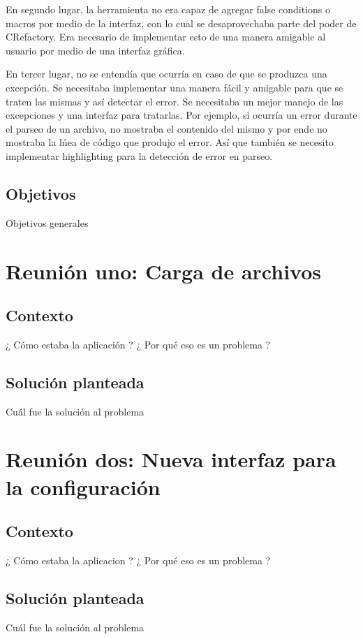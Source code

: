 \documentclass[a4paper,oneside,10pt]{article}
\begin{document}
En segundo lugar, la herramienta no era capaz de agregar false conditions o macros por medio de la interfaz, con lo cual se desaprovechaba  parte del poder de CRefactory. Era necesario de implementar esto de una manera amigable al usuario por medio de una interfaz gr\'afica.

En tercer lugar, no se entend\'ia que ocurr\'ia en caso de que se produzca una excepci\'on. Se necesitaba implementar una manera f\'acil y amigable para que se traten las mismas y as\'i detectar el error. Se necesitaba un mejor manejo de las excepciones y una interfaz para tratarlas.
Por ejemplo, si ocurr\'ia un error durante el parseo de un archivo, no mostraba el contenido del mismo y por ende no mostraba la l\'nea de c\'odigo que produjo el error. As\'i que tambi\'en se necesito implementar highlighting para la detecci\'on de error en parseo.


\subsection{Objetivos}
Objetivos generales

\section{Reuni\'on uno: Carga de archivos}

\subsection{Contexto}
¿ C\'omo estaba la aplicaci\'on ? ¿ Por qu\'e eso es un problema ?

\subsection{Soluci\'on planteada}
Cu\'al fue la soluci\'on al problema

\section{Reuni\'on dos: Nueva interfaz para la configuraci\'on}

\subsection{Contexto}
¿ C\'omo estaba la aplicacion ? ¿ Por qu\'e eso es un problema ?

\subsection{Soluci\'on planteada}
Cu\'al fue la soluci\'on al problema
\end{document}
